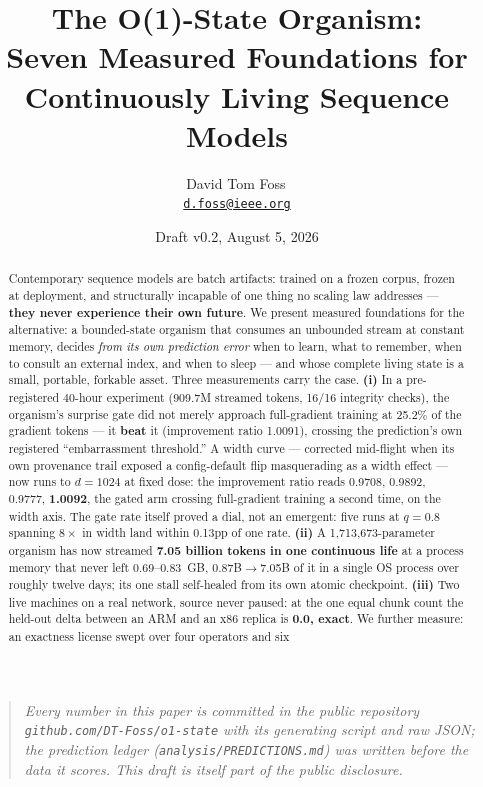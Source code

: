 \documentclass[11pt]{article}
\title{\bfseries The O(1)-State Organism:\\
Seven Measured Foundations for Continuously Living Sequence Models}
\author{David Tom Foss\,\orcidlink{0009-0004-0289-7154}\\[3pt]
{\normalsize\href{mailto:d.foss@ieee.org}{\texttt{d.foss@ieee.org}}}}
\date{Draft v0.2, August 5, 2026}
\theoremstyle{definition}
\newcommand{\code}[1]{\texttt{#1}}
\begin{document}
\maketitle

\begin{quote}
\raggedright
\itshape
Every number in this paper is committed in the public repository
\code{github.com/DT-Foss/o1-state} with its generating script and raw JSON;
the prediction ledger (\code{analysis/PREDICTIONS.md}) was written before
the data it scores. This draft is itself part of the public disclosure.
\end{quote}

\begin{abstract}
Contemporary sequence models are batch artifacts: trained on a frozen corpus,
frozen at deployment, and structurally incapable of one thing no scaling law
addresses --- \textbf{they never experience their own future}. We present
measured foundations for the alternative: a bounded-state organism that
consumes an unbounded stream at constant memory, decides \emph{from its own
prediction error} when to learn, what to remember, when to consult an
external index, and when to sleep --- and whose complete living state is a
small, portable, forkable asset. Three measurements carry the case.
\textbf{(i)} In a pre-registered 40-hour experiment (909.7M streamed tokens,
16/16 integrity checks), the organism's surprise gate did not merely approach
full-gradient training at 25.2\% of the gradient tokens --- it \textbf{beat}
it (improvement ratio 1.0091), crossing the prediction's own registered
``embarrassment threshold.'' A width curve --- corrected mid-flight when its
own provenance trail exposed a config-default flip masquerading as a width
effect --- now runs to $d{=}1024$ at fixed dose: the improvement ratio reads
0.9708, 0.9892, 0.9777, \textbf{1.0092}, the gated arm crossing full-gradient
training a second time, on the width axis. The gate rate itself proved a
dial, not an emergent: five runs at $q{=}0.8$ spanning $8\times$ in width
land within 0.13pp of one rate. \textbf{(ii)} A 1{,}713{,}673-parameter organism
has now streamed \textbf{7.05 billion tokens in one continuous life} at a
process memory that never left 0.69--0.83~GB, 0.87B$\to$7.05B of it in a
single OS process over roughly twelve days; its one stall self-healed from
its own atomic checkpoint. \textbf{(iii)} Two live machines on a real
network, source never paused: at the one equal chunk count the held-out
delta between an ARM and an x86 replica is \textbf{0.0, exact}. We further
measure: an exactness license swept over four operators and six

\end{abstract}
\end{document}
